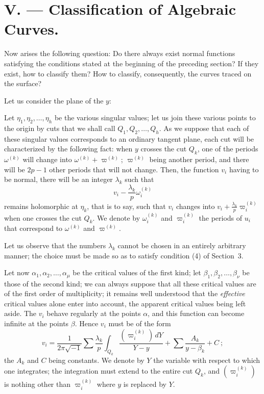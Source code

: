 \documentclass{article}
\begin{document}
\section*{V. --- Classification of Algebraic Curves.}

Now arises the following question: Do there always exist normal functions satisfying the conditions stated at the beginning of the preceding section? If they exist, how to classify them? How to classify, consequently, the curves traced on the surface?

Let us consider the plane of the $y$:

Let $\eta_{1}, \eta_{2}, \ldots, \eta_{h}$ be the various singular values; let us join these various points to the origin by cuts that we shall call $Q_{1}, Q_{2}, \ldots, Q_{h}$. As we suppose that each of these singular values corresponds to an ordinary tangent plane, each
cut will be characterized by the following fact: when $y$ crosses the cut $Q_{k}$, one of the periods $\omega^{(k)}$ will change into $\omega^{(k)} + \varpi^{(k)}$; $\varpi^{(k)}$ being another period, and there will be $2p - 1$ other periods that will not change. Then, the function $v_{i}$ having to be normal, there will be an integer $\lambda_{k}$ such that
\[
v_{i} - \frac{\lambda_{k}}{p} \omega_{i}^{(k)}
\]
remains holomorphic at $\eta_{k}$, that is to say, such that $v_{i}$ changes into $v_{i} + \frac{\lambda_{k}}{p} \varpi_{i}^{(k)}$ when one crosses the cut $Q_{k}$. We denote by $\omega_{i}^{(k)}$ and $\varpi_{i}^{(k)}$ the periods of $u_{i}$ that correspond to $\omega^{(k)}$ and $\varpi^{(k)}$.

Let us observe that the numbers $\lambda_{k}$ cannot be chosen in an entirely arbitrary manner; the choice must be made so as to satisfy condition (4) of Section~3.

Let now $\alpha_{1}, \alpha_{2}, \ldots, \alpha_{\mu}$ be the critical values of the first kind; let $\beta_{1}, \beta_{2}, \ldots, \beta_{\nu}$ be those of the second kind; we can always suppose that all these critical values are of the first order of multiplicity; it remains well understood that the \emph{effective} critical values alone enter into account, the apparent critical values being left aside. The $v_{i}$ behave regularly at the points $\alpha$, and this function can become infinite at the points $\beta$. Hence $v_{i}$ must be of the form
\[
v_{i} = \frac{1}{2 \pi \sqrt{-1}} \sum \frac{\lambda_{k}}{p} \int_{Q_{k}} \frac{(\varpi_{i}^{(k)}) \,dY}{Y - y} + \sum \frac{A_{k}}{y - \beta_{k}} + C~; \tag{1}
\]
the $A_{k}$ and $C$ being constants. We denote by $Y$ the variable with respect to which one integrates; the integration must extend to the entire cut $Q_{k}$, and $(\varpi_{i}^{(k)})$ is nothing other than $\varpi_{i}^{(k)}$ where $y$ is replaced by $Y$.
\end{document}
